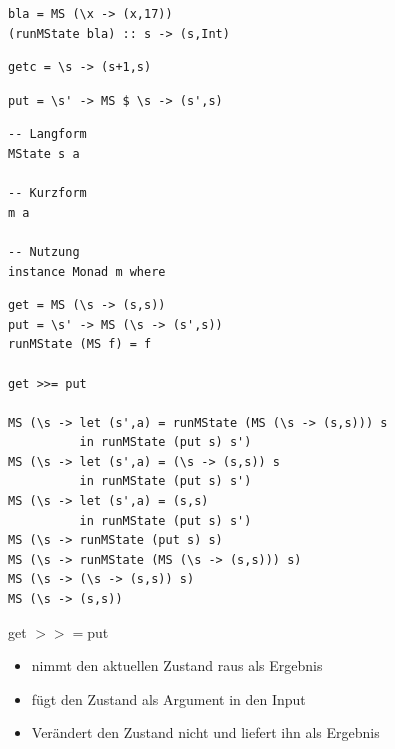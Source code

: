 		\lstHaskell
		\begin{lstlisting}
bla = MS (\x -> (x,17))
(runMState bla) :: s -> (s,Int)
		\end{lstlisting}

		\begin{lstlisting}
getc = \s -> (s+1,s)
		\end{lstlisting}

		\begin{lstlisting}
put = \s' -> MS $ \s -> (s',s)
		\end{lstlisting}

		\begin{lstlisting}
-- Langform
MState s a

-- Kurzform
m a

-- Nutzung
instance Monad m where
		\end{lstlisting}

		\lstHaskell[detaillierte Aufschlüsselung anhand von \texttt{get >>= put}]
		\begin{lstlisting}
get = MS (\s -> (s,s))
put = \s' -> MS (\s -> (s',s))
runMState (MS f) = f

get >>= put

MS (\s -> let (s',a) = runMState (MS (\s -> (s,s))) s
          in runMState (put s) s')
MS (\s -> let (s',a) = (\s -> (s,s)) s
          in runMState (put s) s')
MS (\s -> let (s',a) = (s,s)
          in runMState (put s) s')
MS (\s -> runMState (put s) s)
MS (\s -> runMState (MS (\s -> (s,s))) s)
MS (\s -> (\s -> (s,s)) s)
MS (\s -> (s,s))
		\end{lstlisting}
		get $>>=$put
		\begin{itemize}
			\item nimmt den aktuellen Zustand raus als Ergebnis
			\item fügt den Zustand als Argument in den Input
			\item Verändert den Zustand nicht und liefert ihn als Ergebnis
		\end{itemize}
		
